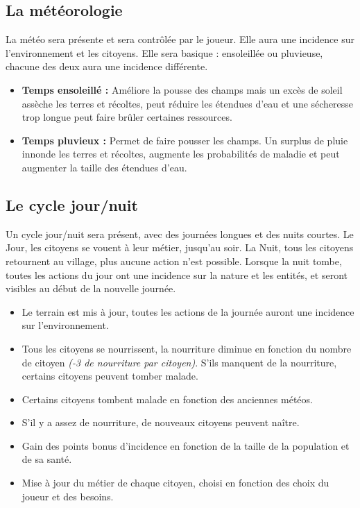 \documentclass[a4paper]{memoir}
\begin{document}
			\subsection{La météorologie}
				La météo sera présente et sera contrôlée par le joueur. Elle aura une incidence sur l'environnement et les citoyens. Elle sera basique : ensoleillée ou pluvieuse, chacune des deux aura une incidence différente. 
				\begin{itemize}[label=$\bullet$]
					\item \textbf{Temps ensoleillé :} Améliore la pousse des champs mais un excès de soleil assèche les terres et récoltes, peut réduire les étendues d'eau et une sécheresse trop longue peut faire brûler certaines ressources.
					\item \textbf{Temps pluvieux :} Permet de faire pousser les champs. Un surplus de pluie innonde les terres et récoltes, augmente les probabilités de maladie et peut augmenter la taille des étendues d'eau.
				\end{itemize}


			\subsection{Le cycle jour/nuit}
				\label{Cycle}
				Un cycle jour/nuit sera présent, avec des journées longues et des nuits courtes. Le Jour, les citoyens se vouent à leur métier, jusqu'au soir. La Nuit, tous les citoyens retournent au village, plus aucune action n'est possible. Lorsque la nuit tombe, toutes les actions du jour ont une incidence sur la nature et les entités, et seront visibles au début de la nouvelle journée.
				\begin{itemize}[label=$\bullet$]
					\item Le terrain est mis à jour, toutes les actions de la journée auront une incidence sur l'environnement.
					\item Tous les citoyens se nourrissent, la nourriture diminue en fonction du nombre de citoyen \textit{(-3 de nourriture par citoyen)}. S'ils manquent de la nourriture, certains citoyens peuvent tomber malade.
					\item Certains citoyens tombent malade en fonction des anciennes météos.
					\item S'il y a assez de nourriture, de nouveaux citoyens peuvent naître.
					\item Gain des points bonus d'incidence en fonction de la taille de la population et de sa santé.
					\item Mise à jour du métier de chaque citoyen, choisi en fonction des choix du joueur et des besoins.
				\end{itemize}
\end{document}
